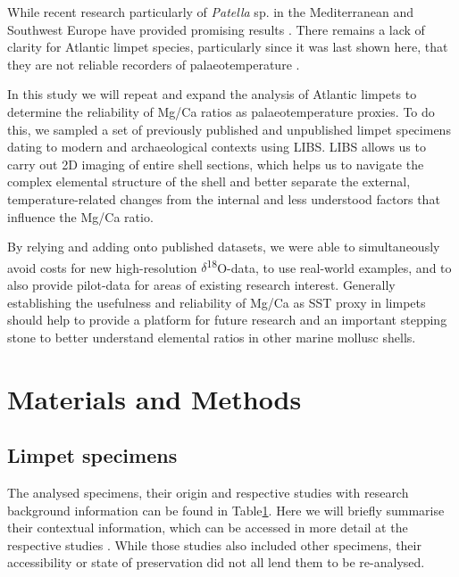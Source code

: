 \documentclass[
  authoryear,
  preprint,
  3p]{elsarticle}
\begin{document}
While recent research particularly of \emph{Patella} sp. in the
Mediterranean and Southwest Europe have provided promising results
\citep{Hausmann2019-fi, Garcia-Escarzaga2015-jc, Garcia-Escarzaga2018-nf}.
There remains a lack of clarity for Atlantic limpet species,
particularly since it was last shown here, that they are not reliable
recorders of palaeotemperature \citep{Graniero2015-zv}.

In this study we will repeat and expand the analysis of Atlantic limpets
to determine the reliability of Mg/Ca ratios as palaeotemperature
proxies. To do this, we sampled a set of previously published and
unpublished limpet specimens dating to modern and archaeological
contexts using LIBS. LIBS allows us to carry out 2D imaging of entire
shell sections, which helps us to navigate the complex elemental
structure of the shell and better separate the external,
temperature-related changes from the internal and less understood
factors that influence the Mg/Ca ratio.

By relying and adding onto published datasets, we were able to
simultaneously avoid costs for new high-resolution
\(\delta\)\textsuperscript{18}O-data, to use real-world examples, and to
also provide pilot-data for areas of existing research interest.
Generally establishing the usefulness and reliability of Mg/Ca as SST
proxy in limpets should help to provide a platform for future research
and an important stepping stone to better understand elemental ratios in
other marine mollusc shells.

\section{Materials and Methods}\label{Methods}

\subsection{Limpet specimens}\label{limpet-specimens}

The analysed specimens, their origin and respective studies with
research background information can be found in
Table\hyperref[Table_1]{1}. Here we will briefly summarise their
contextual information, which can be accessed in more detail at the
respective studies
\citep{Nicastro2020-ih, Surge2012-ba, Graniero2017-io}. While those
studies also included other specimens, their accessibility or state of
preservation did not all lend them to be re-analysed.

\label{Table_1}
\fontsize{8pt}{8pt}\selectfont
\end{document}
